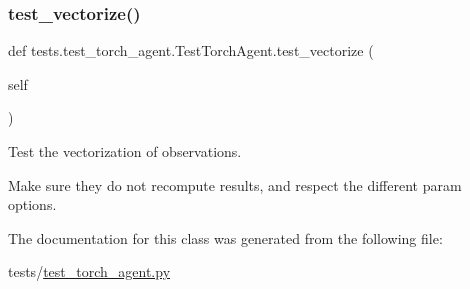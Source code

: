 \subsubsection{\texorpdfstring{test\+\_\+vectorize()}{test\_vectorize()}}
{\footnotesize\ttfamily def tests.\+test\+\_\+torch\+\_\+agent.\+Test\+Torch\+Agent.\+test\+\_\+vectorize (\begin{DoxyParamCaption}\item[{}]{self }\end{DoxyParamCaption})}

\begin{DoxyVerb}Test the vectorization of observations.

Make sure they do not recompute results, and respect the different param
options.
\end{DoxyVerb}
 

The documentation for this class was generated from the following file\+:\begin{DoxyCompactItemize}
\item 
tests/\hyperlink{test__torch__agent_8py}{test\+\_\+torch\+\_\+agent.\+py}\end{DoxyCompactItemize}
